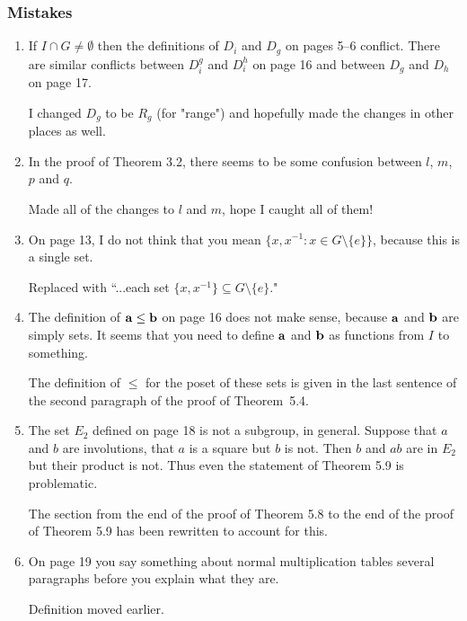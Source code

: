 \documentclass[12pt,a4paper]{article}
\newenvironment{QandA}{\begin{enumerate}[label=\bfseries\alph*.]\bfseries}
                      {\end{enumerate}}
\newenvironment{answered}{\par\normalfont}{}
\begin{document}
\subsubsection*{Mistakes}

\begin{QandA}

\item If $I \cap G \neq \emptyset$ then the definitions of $D_i$ and $D_g$ on pages 5--6 conflict.  There are similar conflicts between $D_i^g$ and $D_i^h$ on page 16 and between $D_g$ and $D_h$ on page 17. 

\begin{answered}
I changed $D_g$ to be $R_g$ (for "range") and hopefully made the changes in other places as well.
\end{answered}


\item  In the proof of Theorem 3.2, there seems to be some confusion between $l$, $m$, $p$ and $q$. 

\begin{answered}
Made all of the changes to $l$ and $m$, hope I caught all of them!
\end{answered}


\item On page 13, I do not think that you mean $\{x,x^{-1} : x \in G \setminus \{e\} \}$, because this is a single set.

\begin{answered}
Replaced with ``...each set $\{ x,x^{-1} \} \subseteq G\setminus \{e\}$."
\end{answered}

\item The definition of ${\bf a} \leq {\bf b}$ on page 16 does not make sense, because ${\bf a}$ and ${\bf  b}$ are simply sets.  It seems that you need to define ${\bf a}$ and ${\bf b}$ as functions from $I$ to something.

\begin{answered} 
The definition of $\leq$ for the poset of  these sets is given in the last sentence of the second paragraph of the proof of Theorem~5.4.
\end{answered}


\item The set $E_2$ defined on page 18 is not a subgroup, in general. Suppose that $a$ and $b$ are involutions, that $a$ is a square but $b$ is not. Then $b$ and $ab$ are in $E_2$ but their product is not. Thus even the statement of Theorem 5.9 is problematic.

\begin{answered}
The section from the end of the proof of Theorem 5.8 to the end of the proof of Theorem 5.9 has been rewritten to account for this.
\end{answered}

\item
On page 19 you say something about normal multiplication tables several paragraphs before you explain what they are.

\begin{answered}
Definition moved earlier.
\end{answered}

\end{QandA}
\end{document}
